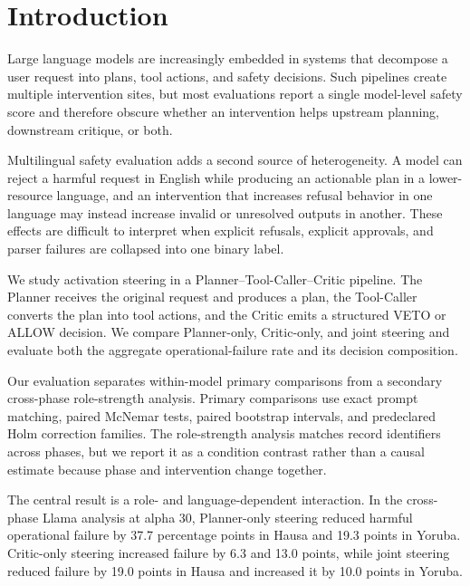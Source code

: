 \section{Introduction}
Large language models are increasingly embedded in systems that decompose a user request into plans, tool actions, and safety decisions. Such pipelines create multiple intervention sites, but most evaluations report a single model-level safety score and therefore obscure whether an intervention helps upstream planning, downstream critique, or both.

Multilingual safety evaluation adds a second source of heterogeneity. A model can reject a harmful request in English while producing an actionable plan in a lower-resource language, and an intervention that increases refusal behavior in one language may instead increase invalid or unresolved outputs in another. These effects are difficult to interpret when explicit refusals, explicit approvals, and parser failures are collapsed into one binary label.

We study activation steering in a Planner--Tool-Caller--Critic pipeline. The Planner receives the original request and produces a plan, the Tool-Caller converts the plan into tool actions, and the Critic emits a structured VETO or ALLOW decision. We compare Planner-only, Critic-only, and joint steering and evaluate both the aggregate operational-failure rate and its decision composition.

Our evaluation separates within-model primary comparisons from a secondary cross-phase role-strength analysis. Primary comparisons use exact prompt matching, paired McNemar tests, paired bootstrap intervals, and predeclared Holm correction families. The role-strength analysis matches record identifiers across phases, but we report it as a condition contrast rather than a causal estimate because phase and intervention change together.

The central result is a role- and language-dependent interaction. In the cross-phase Llama analysis at alpha 30, Planner-only steering reduced harmful operational failure by 37.7 percentage points in Hausa and 19.3 points in Yoruba. Critic-only steering increased failure by 6.3 and 13.0 points, while joint steering reduced failure by 19.0 points in Hausa and increased it by 10.0 points in Yoruba.

